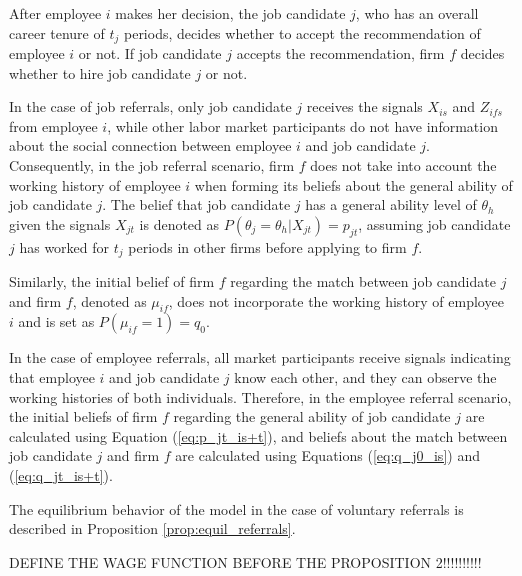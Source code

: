 \documentclass[12pt]{article}
\begin{document}
After employee $i$ makes her decision, the job candidate $j$, who has an overall career tenure of $t_j$ periods, decides whether to accept the recommendation of employee $i$ or not. If job candidate $j$ accepts the recommendation, firm $f$ decides whether to hire job candidate $j$ or not.

In the case of job referrals, only job candidate $j$ receives the signals $X_{is}$ and $Z_{ifs}$ from employee $i$, while other labor market participants do not have information about the social connection between employee $i$ and job candidate $j$. Consequently, in the job referral scenario, firm $f$ does not take into account the working history of employee $i$ when forming its beliefs about the general ability of job candidate $j$. The belief that job candidate $j$ has a general ability level of $\theta_h$ given the signals $X_{jt}$ is denoted as $P(\theta_j = \theta_h | X_{jt}) = p_{jt}$, assuming job candidate $j$ has worked for $t_j$ periods in other firms before applying to firm $f$.

Similarly, the initial belief of firm $f$ regarding the match between job candidate $j$ and firm $f$, denoted as $\mu_{if}$, does not incorporate the working history of employee $i$ and is set as $P(\mu_{if} = 1) = q_0$.

In the case of employee referrals, all market participants receive signals indicating that employee $i$ and job candidate $j$ know each other, and they can observe the working histories of both individuals. Therefore, in the employee referral scenario, the initial beliefs of firm $f$ regarding the general ability of job candidate $j$ are calculated using Equation (\ref{eq:p_jt_is+t}), and beliefs about the match between job candidate $j$ and firm $f$ are calculated using Equations (\ref{eq:q_j0_is}) and (\ref{eq:q_jt_is+t}).

The equilibrium behavior of the model in the case of voluntary referrals is described in Proposition \ref{prop:equil_referrals}.

DEFINE THE WAGE FUNCTION BEFORE THE PROPOSITION 2!!!!!!!!!!
\end{document}
